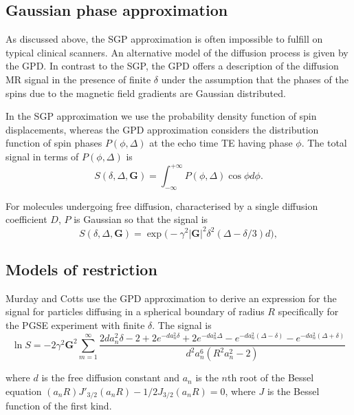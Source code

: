 \subsection{Gaussian phase approximation}
\label{GPD}
As discussed above, the SGP approximation is often impossible to fulfill on typical clinical scanners. An alternative model of the diffusion process is given by the \gls{GPD}. In contrast to the SGP, the \gls{GPD} offers a description of the diffusion MR signal in the presence of finite $\delta$ under the assumption that the phases of the spins due to the magnetic field gradients are Gaussian distributed.

In the SGP approximation we use the probability density function of spin displacements, whereas the GPD approximation considers the distribution function of spin phases $P(\phi,\Delta)$ at the echo time TE  having phase $\phi$. The total signal in terms of $P(\phi,\Delta)$ is
\begin{equation}
S(\delta,\Delta,\textbf{G})  = \int_{-\infty}^{+\infty}P(\phi,\Delta)\cos\phi d\phi.
\end{equation}

For molecules undergoing free diffusion, characterised by a single diffusion coefficient $D$,  $P$ is Gaussian so that the signal is
\begin{equation}
S(\delta,\Delta,\textbf{G})  =  \exp\Big(- \gamma^{2} |\textbf{G}|^{2} \delta^{2} (\Delta - \delta/3) d\Big),
\label{freediff}
\end{equation}

\subsection{Models of restriction}
Murday and Cotts \cite{Murday} use the GPD approximation to derive an expression for the signal for particles diffusing in a spherical boundary  of radius $R$ specifically for the PGSE experiment with finite $\delta$.  The  signal is
\begin{equation}
\ln S = -2\gamma^{2}\textbf{G}^{2}\sum_{m=1}^{\infty}\frac{2da_{n}^{2}\delta-2+2e^{-da_{n}^{2}\delta}+2e^{-da_{n}^{2}\Delta}- e^{-da_{n}^{2}(\Delta-\delta)} -e^{-da_{n}^{2}(\Delta+\delta)}}{d^{2}a_{n}^{6}(R^{2}a_{n}^{2}- 2)}
\label{MCotts}
\end{equation}

where  $d$ is the free diffusion constant and  $a_{n}$ is the $n$th root of the Bessel equation $ (a_{n}R)J'_{3/2}(a_{n}R)-1/2 J_{3/2}(a_{n}R)=0$, where $J$ is the Bessel function of the first kind.


